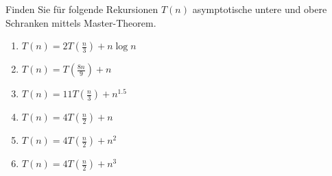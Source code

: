 
\begin{exercise}

Finden Sie für folgende Rekursionen $T(n)$ asymptotische untere und obere Schranken mittels Master-Theorem.

\begin{enumerate}[label = \alph*]
  \item $T(n) = 2T(\frac{n}{3}) + n \log n$
  \item $T(n) = T(\frac{8n}{9}) + n$
  \item $T(n) = 11T(\frac{n}{3}) + n^{1.5}$
  \item $T(n) = 4T(\frac{n}{2}) + n$
  \item $T(n) = 4T(\frac{n}{2}) + n^2$
  \item $T(n) = 4T(\frac{n}{2}) + n^3$
\end{enumerate}

\end{exercise}


